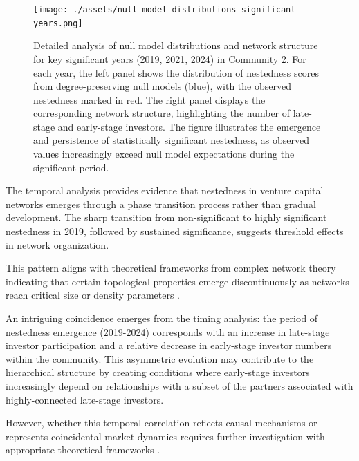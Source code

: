 \begin{figure}[htbp]
\centering
\texttt{[image: ./assets/null-model-distributions-significant-years.png]}
\caption{Detailed analysis of null model distributions and network structure for key significant years (2019, 2021, 2024) in Community 2. For each year, the left panel shows the distribution of nestedness scores from degree-preserving null models (blue), with the observed nestedness marked in red. The right panel displays the corresponding network structure, highlighting the number of late-stage and early-stage investors. The figure illustrates the emergence and persistence of statistically significant nestedness, as observed values increasingly exceed null model expectations during the significant period.}
\label{fig:null_model_distributions_significant_years}
\end{figure}

The temporal analysis provides evidence that nestedness in venture capital networks emerges through a phase transition process rather than gradual development. The sharp transition from non-significant to highly significant nestedness in 2019, followed by sustained significance, suggests threshold effects in network organization. 

This pattern aligns with theoretical frameworks from complex network theory indicating that certain topological properties emerge discontinuously as networks reach critical size or density parameters \cite{Mariani2019}.


An intriguing coincidence emerges from the timing analysis: the period of nestedness emergence (2019-2024) corresponds with an increase in late-stage investor participation and a relative decrease in early-stage investor numbers within the community. This asymmetric evolution may contribute to the hierarchical structure by creating conditions where early-stage investors increasingly depend on relationships with a subset of the partners associated with highly-connected late-stage investors. 


However, whether this temporal correlation reflects causal mechanisms or represents coincidental market dynamics requires further investigation with appropriate theoretical frameworks \cite{Dalle2025}.

